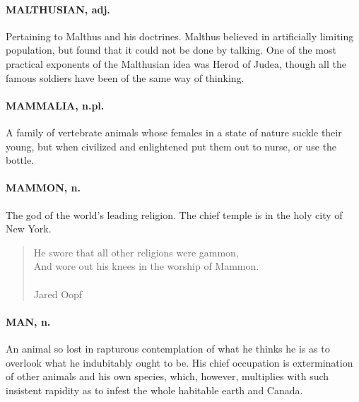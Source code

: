 \documentclass[11pt]{article}
\begin{document}
\paragraph{MALTHUSIAN, adj.}  Pertaining to Malthus and his doctrines.  Malthus
believed in artificially limiting population, but found that it could
not be done by talking.  One of the most practical exponents of the
Malthusian idea was Herod of Judea, though all the famous soldiers
have been of the same way of thinking.

\paragraph{MAMMALIA, n.pl.}  A family of vertebrate animals whose females in a
state of nature suckle their young, but when civilized and enlightened
put them out to nurse, or use the bottle.

\paragraph{MAMMON, n.}  The god of the world's leading religion.  The chief temple
is in the holy city of New York.

\begin{quote}   He swore that all other religions were gammon, \\
  And wore out his knees in the worship of Mammon. \\
 \\
Jared Oopf \end{quote}


\paragraph{MAN, n.}  An animal so lost in rapturous contemplation of what he
thinks he is as to overlook what he indubitably ought to be.  His
chief occupation is extermination of other animals and his own
species, which, however, multiplies with such insistent rapidity as to
infest the whole habitable earth and Canada.
\end{document}
